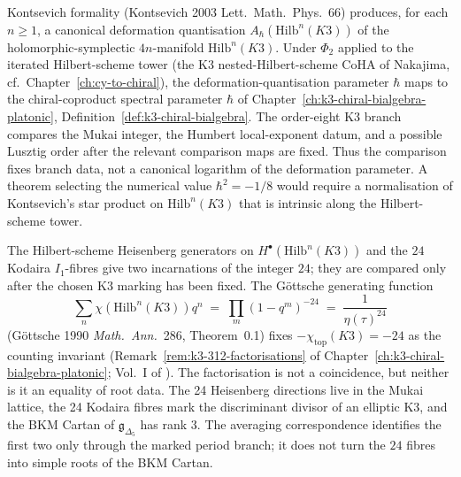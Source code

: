 \begin{remark}
\label{rem:dcy-kst-dq}
Kontsevich formality (Kontsevich 2003 \textup{Lett.~Math.~Phys.}~66)
produces, for each $n\ge 1$, a canonical deformation quantisation
$A_\hbar(\mathrm{Hilb}^n(K3))$ of the holomorphic-symplectic
$4n$-manifold $\mathrm{Hilb}^n(K3)$. Under $\Phi_2$ applied to the
iterated Hilbert-scheme tower (the K3 nested-Hilbert-scheme CoHA of
Nakajima, cf.\ Chapter~\ref{ch:cy-to-chiral}), the
deformation-quantisation parameter $\hbar$ maps to the chiral-coproduct
spectral parameter $\hbar$ of
Chapter~\ref{ch:k3-chiral-bialgebra-platonic},
Definition~\ref{def:k3-chiral-bialgebra}. The order-eight K3 branch
compares the Mukai integer, the Humbert local-exponent datum, and a
possible Lusztig order after the relevant comparison maps are fixed.
Thus the comparison fixes branch data, not a canonical logarithm of
the deformation parameter. A theorem selecting the numerical value
\(\hbar^2=-1/8\) would require a normalisation of Kontsevich's star
product on \(\mathrm{Hilb}^n(K3)\) that is intrinsic along the
Hilbert-scheme tower.
\end{remark}

\begin{remark}
\label{rem:dcy-hilbert-24-fibres}
The Hilbert-scheme Heisenberg generators on
$H^\bullet(\mathrm{Hilb}^n(K3))$ and the \(24\) Kodaira \(I_1\)-fibres give two incarnations of the integer \(24\); they are compared only after the chosen K3 marking has been fixed. The G\"ottsche generating
function
\[
 \sum_n \chi(\mathrm{Hilb}^n(K3)) q^n
 \;=\; \prod_m (1 - q^m)^{-24}
 \;=\; \frac{1}{\eta(\tau)^{24}}
\]
(G\"ottsche 1990 \emph{Math.~Ann.}~286, Theorem~0.1) fixes
$-\chi_{\mathrm{top}}(K3) = -24$ as the counting invariant
(Remark~\ref{rem:k3-312-factorisations} of
Chapter~\ref{ch:k3-chiral-bialgebra-platonic}; Vol.~I
\cite{VolI} of
\cite{VolI}). The
factorisation is not a coincidence, but neither is it an equality of root data. The 24 Heisenberg directions live in the Mukai lattice, the 24 Kodaira fibres mark the discriminant divisor of an elliptic K3, and the BKM Cartan of \(\mathfrak g_{\Delta_5}\) has rank \(3\). The averaging correspondence identifies the first two only through the marked period branch; it does not turn the \(24\) fibres into simple roots of the BKM Cartan.
\end{remark}

